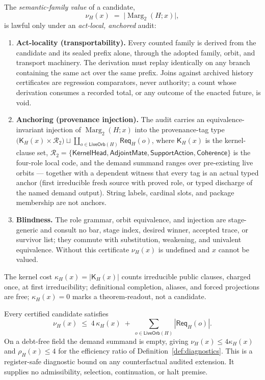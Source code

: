 \begin{definition}
\label{def:semantic-register}
The \emph{semantic-family value} of a candidate,
\[
\nu_H(x) \;=\; \bigl|\operatorname{Marg}_2(H;x)\bigr|,
\]
is lawful only under an \emph{act-local, anchored} audit:
\begin{enumerate}[leftmargin=*, label=\textbf{SR\arabic*.}]
\item \textbf{Act-locality (transportability).} Every counted family is
derived from the candidate and its sealed prefix alone, through the adopted
family, orbit, and transport machinery. The derivation must replay
identically on any branch containing the same act over the same prefix.
Joins against archived history certificates are regression comparators,
never authority; a count whose derivation consumes a recorded total, or any
outcome of the enacted future, is void.
\item \textbf{Anchoring (provenance injection).} The audit carries an
equivalence-invariant injection of \(\operatorname{Marg}_2(H;x)\) into the
provenance-tag type
\(\bigl(\mathsf K_H(x)\times\mathcal R_2\bigr)\sqcup
\coprod_{o\in\mathsf{LiveOrb}(H)}\mathsf{Req}_H(o)\),
where \(\mathsf K_H(x)\) is the kernel-clause set,
\(\mathcal R_2=\{\mathsf{KernelHead},\mathsf{AdjointMate},
\mathsf{SupportAction},\mathsf{Coherence}\}\) is the four-role local code, and
the demand summand ranges over pre-existing live orbits --- together with a
dependent witness that every tag is an actual typed anchor (first irreducible
fresh source with proved role, or typed discharge of the named demand
output). String labels, cardinal slots, and package membership are not
anchors.
\item \textbf{Blindness.} The role grammar, orbit equivalence, and injection
are stage-generic and consult no bar, stage index, desired winner, accepted
trace, or survivor list; they commute with substitution, weakening, and
univalent equivalence. Without this certificate \(\nu_H(x)\) is undefined and
\(x\) cannot be valued.
\end{enumerate}
The kernel cost \(\kappa_H(x) = |\mathsf K_H(x)|\) counts irreducible public
clauses, charged once, at first irreducibility; definitional completion,
aliases, and forced projections are free; \(\kappa_H(x)=0\) marks a
theorem-readout, not a candidate.
\end{definition}

\begin{proposition}
\label{prop:provenance-bound}
Every certified candidate satisfies
\[
\nu_H(x) \;\le\; 4\,\kappa_H(x) \;+\;
\sum_{o\in\mathsf{LiveOrb}(H)}|\mathsf{Req}_H(o)|.
\]
On a debt-free field the demand summand is empty, giving
\(\nu_H(x)\le 4\kappa_H(x)\) and \(\rho_H(x)\le 4\) for the efficiency ratio
of Definition~\ref{def:diagnostics}. This is a register-safe diagnostic bound
on any counterfactual audited extension. It supplies no admissibility,
selection, continuation, or halt premise.
\end{proposition}

